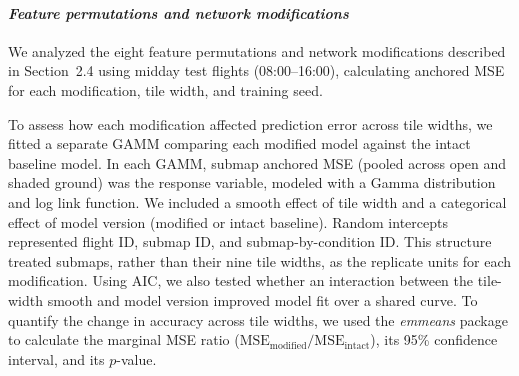 \documentclass[12pt]{article}
\begin{document}
\paragraph*{\textit{Feature permutations and network modifications}}
We analyzed the eight feature permutations and network modifications described in Section~2.4 using midday test flights (08:00--16:00), calculating anchored MSE for each modification, tile width, and training seed.

To assess how each modification affected prediction error across tile widths, we fitted a separate GAMM comparing each modified model against the intact baseline model. In each GAMM, submap anchored MSE (pooled across open and shaded ground) was the response variable, modeled with a Gamma distribution and log link function. We included a smooth effect of tile width and a categorical effect of model version (modified or intact baseline). Random intercepts represented flight ID, submap ID, and submap-by-condition ID. This structure treated submaps, rather than their nine tile widths, as the replicate units for each modification. Using AIC, we also tested whether an interaction between the tile-width smooth and model version improved model fit over a shared curve. To quantify the change in accuracy across tile widths, we used the \textit{emmeans} package \citep{Lenth2024emmeans} to calculate the marginal MSE ratio ($\text{MSE}_\text{modified} / \text{MSE}_\text{intact}$), its 95\% confidence interval, and its $p$-value.
\end{document}
